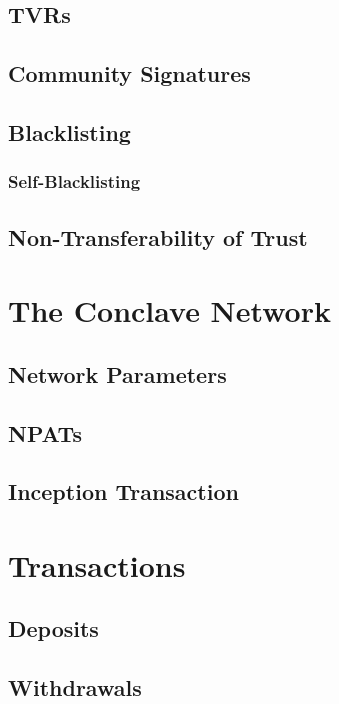 \documentclass{article}
\begin{document}
\subsection{TVRs}

\subsection{Community Signatures}

\subsection{Blacklisting}

\subsubsection{Self-Blacklisting}

\subsection{Non-Transferability of Trust}

\section{The Conclave Network}

\subsection{Network Parameters}

\subsection{NPATs}

\subsection{Inception Transaction}

\section{Transactions}

\subsection{Deposits}

\subsection{Withdrawals}
\end{document}
